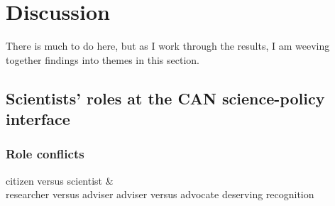 \chapter{Discussion}\label{ch:discussion}

There is much to do here, but as I work through the results, I am weeving together findings into themes in this section.

\section{Scientists' roles at the CAN science-policy interface}\label{sec:disroles}

\subsection{Role conflicts}
citizen versus scientist \&  \vfill {} \\[5mm]
researcher versus adviser
adviser versus advocate
deserving recognition

